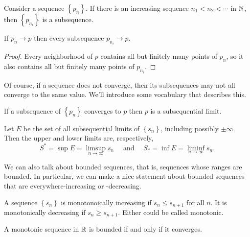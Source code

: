 \documentclass[../m131main.tex]{subfiles}
\begin{document}
\begin{definition}[Subsequence]
    Consider a sequence $\left\{ p_n \right\}$.
    If there is an increasing sequence $n_1 < n_2 < \cdots$ in $\mathbb{N}$, then $\left\{ p_{n_i} \right\}$ is a subsequence.
\end{definition}

\begin{theorem}
    If $p_n \to p$ then every subsequence $p_{n_i} \to p$.
\end{theorem}

\begin{proof}
    Every neighborhood of $p$ contains all but finitely many points of $p_n$, so it also contains all but finitely many points of $p_{n_i}$.
\end{proof}

Of course, if a sequence does not converge, then its subsequences may not all converge to the same value.
We'll introduce some vocabulary that describes this.

\begin{definition}
    If a subsequence of $\left\{ p_n \right\}$ converges to $p$ then $p$ is a subsequential limit.
\end{definition}

\begin{definition}
    Let $E$ be the set of all subsequential limits of $\left\{ s_n \right\}$, including possibly $\pm \infty$.
    Then the upper and lower limits are, respectively,
    \[ S^* = \sup E = \limsup_{n \to \infty} s_n \quad\text{ and }\quad S_* = \inf E = \liminf_{n \to \infty} s_n. \]
\end{definition}

We can also talk about bounded sequences, that is, sequences whose ranges are bounded.
In particular, we can make a nice statement about bounded sequences that are everywhere-increasing or -decreasing.

\begin{definition}
    A sequence $\left\{ s_n \right\}$ is monotonoically increasing if $s_n \leq s_{n+1}$ for all $n$.
    It is monotonically decreasing if $s_n \geq s_{n+1}$.
    Either could be called monotonic.
\end{definition}

\begin{theorem}[]
    A monotonic sequence in $\mathbb{R}$ is bounded if and only if it converges.
\end{theorem}
\end{document}
